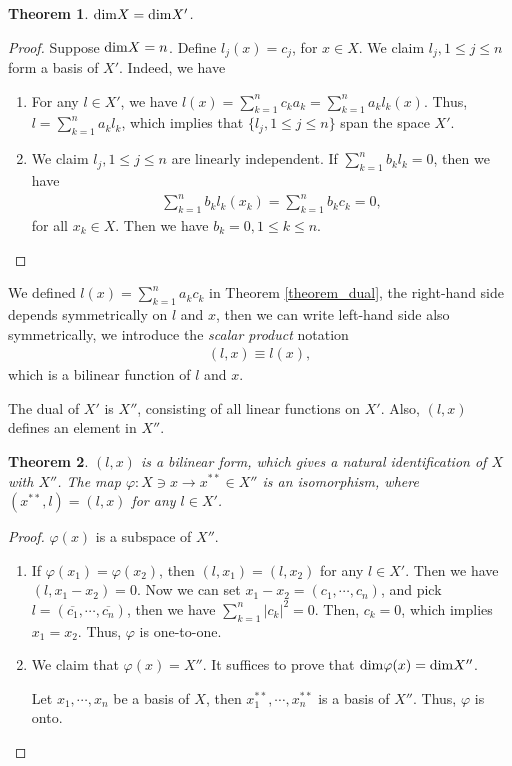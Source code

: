 \documentclass[11pt]{book}
\newtheorem{theorem}{Theorem}[chapter]
\theoremstyle{definition}
\numberwithin{equation}{chapter}
\begin{document}
\begin{theorem}
${\rm dim}X = {\rm dim}X'$.
\end{theorem}
\begin{proof}
Suppose ${\rm dim}X = n$. Define $l_j(x) = c_j$, for $x\in X$. We claim $l_j, 1\leq j\leq n$ form a basis of $X'$. Indeed, we have
\begin{enumerate}[label=(\alph*)]
    \item For any $l\in X'$, we have $l(x) = \sum^n_{k=1}c_k a_k = \sum^n_{k=1}a_k l_k(x)$. Thus, $l = \sum^n_{k=1}a_k l_k$, which implies that $\{l_j, 1\leq j\leq n\}$ span the space $X'$.
    \item We claim $l_j, 1\leq j\leq n$ are linearly independent. If $\sum^n_{k=1}b_k l_k = 0$, then we have 
    \begin{align*}
        \sum^n_{k=1}b_k l_k(x_k) = \sum^n_{k=1}b_k c_k = 0,
    \end{align*}
    for all $x_k\in X$. Then we have $b_k = 0, 1\leq k \leq n$.
\end{enumerate}
\end{proof}

\medskip

We defined $l(x) = \sum^n_{k=1} a_k c_k$ in Theorem \ref{theorem_dual}, the right-hand side depends symmetrically on $l$ and $x$, then we can write left-hand side also symmetrically, we introduce the \emph{scalar product} notation
\begin{align*}
    (l,x) \equiv l(x),
\end{align*}
which is a bilinear function of $l$ and $x$. 

The dual of $X'$ is $X''$, consisting of all linear functions on $X'$. Also, $(l,x)$ defines an element in $X''$.

\begin{theorem}\label{dual_identification_theorem}
$(l,x)$ is a bilinear form, which gives a natural identification of $X$ with $X''$. The map $\varphi:X\ni x \to x^{**}\in X''$ is an isomorphism, where $(x^{**},l) = (l,x)$ for any $l\in X'$.
\end{theorem}
\begin{proof}
$\varphi(x)$ is a subspace of $X''$.
\begin{enumerate}[label=(\alph*)]
    \item If $\varphi(x_1) = \varphi(x_2)$, then $(l,x_1) = (l,x_2)$ for any $l\in X'$. Then we have $(l,x_1 - x_2) = 0$. Now we can set $x_1 - x_2 = (c_1,\cdots,c_n)$, and pick $l = (\overline{c_1},\cdots,\overline{c_n})$, then we have $\sum^n_{k=1}|c_k|^2 = 0$. Then, $c_k = 0$, which implies $x_1 = x_2$. Thus, $\varphi$ is one-to-one.
    
    \item We claim that $\varphi(x) = X''$. It suffices to prove that ${\rm dim}\varphi(x) = {\rm dim}X''$.
    
    Let $x_1,\cdots,x_n$ be a basis of $X$, then $x_1^{**},\cdots,x_n^{**}$ is a basis of $X''$. Thus, $\varphi$ is onto.
\end{enumerate}
\end{proof}
\end{document}
